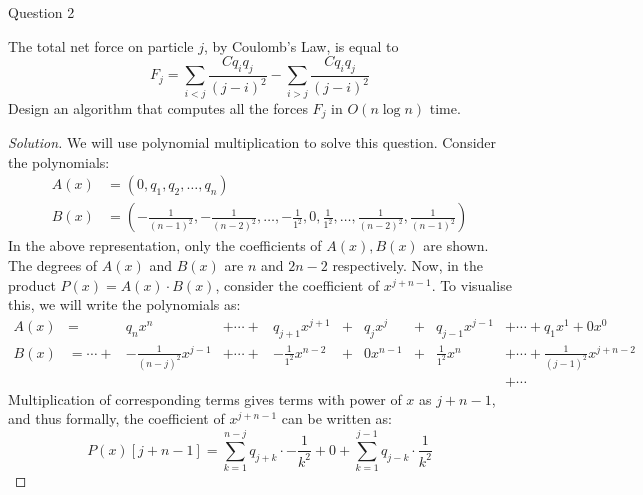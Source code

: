 \begin{solution}{Question 2}\label{ques:2}
    \begin{question}
        The total net force on particle $j$, by Coulomb’s Law, is equal to
        \begin{equation}
          F_j = \sum_{i<j}\frac{C q_i q_j}{{(j-i)}^2} - \sum_{i>j}\frac{C q_i q_j}{{(j-i)}^2}
        \end{equation}
        Design an algorithm that computes all the forces $F_j$ in $O(n\log{n})$ time.
    \end{question}
    \tcblower{}
    \begin{proof}[Solution]
      We will use polynomial multiplication to solve this question. Consider the polynomials:
      \begin{equation}
        \begin{split}
          A(x) &= (0, q_1, q_2, \ldots, q_n)\\
          B(x) &= \left(-\frac{1}{{(n-1)}^2}, -\frac{1}{{(n-2)}^2}, \ldots, -\frac{1}{1^2}, 0, \frac{1}{1^2}, \ldots, \frac{1}{{(n-2)}^2}, \frac{1}{{(n-1)}^2}\right)
        \end{split}
      \end{equation}
      In the above representation, only the coefficients of $A(x), B(x)$ are shown. The degrees of $A(x)$ and $B(x)$ are $n$ and $2n-2$ respectively. Now, in the product $P(x) = A(x)\cdot B(x)$, consider the coefficient of $x^{j+n-1}$. To visualise this, we will write the polynomials as:
      \begin{equation}
        \begin{aligned}
          A(x) &= &q_n x^n &+ \cdots + &q_{j+1} x^{j+1} &+ &q_j x^j &+ &q_{j-1} x^{j-1} &+ \cdots + q_1 x^1 + 0 x^0\\
          B(x) &= \cdots + &-\frac{1}{{(n-j)}^2} x^{j-1} &+ \cdots + &-\frac{1}{1^2} x^{n-2} &+ &0 x^{n-1} &+ &\frac{1}{1^2} x^n &+ \cdots + \frac{1}{{(j-1)}^2} x^{j+n-2} \\&&&&&&&&&+ \cdots
        \end{aligned}
      \end{equation}
      Multiplication of corresponding terms gives terms with power of $x$ as $j+n-1$, and thus formally, the coefficient of $x^{j+n-1}$ can be written as:
      \begin{equation}\label{eq:coeff}
        P(x)[j+n-1] = \sum_{k=1}^{n-j}{q_{j+k}\cdot -\frac{1}{k^2}} + 0 + \sum_{k=1}^{j-1}{q_{j-k}\cdot \frac{1}{k^2}}
      \end{equation}

\end{proof}
\end{solution}
